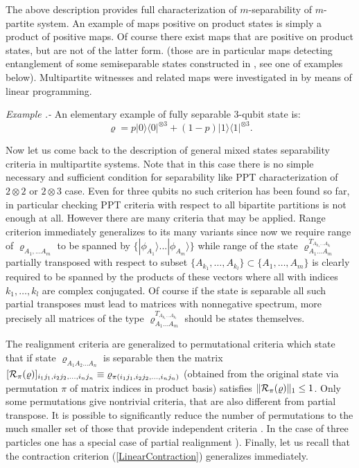 \documentclass[twocolumn,aps,rmp]{revtex4}
\begin{document}
The above description provides full characterization of
$m$-separability of $m$-partite system.  An example of maps positive
on product states is simply a product of positive maps. Of course
there exist maps that are positive on product states, but are not of
the latter form.  (those are in particular maps \cite{multisep}
detecting entanglement of some semiseparable states constructed in
\cite{BennettUPBI1999}, see one of examples below). Multipartite witnesses
and related maps were investigated in \cite{JafarizadehNH2006-wit}
by means of linear programming.

{\it Example .- } An elementary example of fully separable $3$-qubit
state is:
\begin{equation}
\varrho=p|0\rangle \langle 0|^{\otimes 3}+ (1-p)|1\rangle \langle
1|^{\otimes 3}.
\end{equation}

Now let us come back to the description of general mixed states
separability criteria in multipartite systems. Note that in this case
there is no simple necessary and sufficient condition for separability
like PPT characterization of $2 \otimes 2$ or $2 \otimes 3$ case. Even
for three qubits no such criterion has been found so far, in
particular checking PPT criteria with respect to all bipartite
partitions is not enough at all. However there are many criteria that
may be applied. Range criterion immediately generalizes to its many
variants since now we require range of $\varrho_{A_{1},...A_{m}}$ to
be spanned by $\{ |\phi_{A_1}\rangle...|\phi_{A_m}\rangle \}$ while
range of the state $\varrho_{A_{1}...A_{m}}^{T_{ A_{k_1}... A_{k_l}
  }}$ partially transposed with respect to subset $\{
A_{k_1},\ldots,A_{k_l} \} \subset \{ A_{1},\ldots,A_{m} \} $ is
clearly required to be spanned by the products of these vectors where
all with indices $k_1, \ldots, k_l$ are complex conjugated. Of course
if the state is separable all such partial transposes must lead to
matrices with nonnegative spectrum, more precisely all matrices of the
type $\varrho_{A_{1}...A_{m}}^{T_{ A_{k_1}... A_{k_l} }}$ should be
states themselves.

The realignment criteria are generalized to permutational criteria
\cite{HHH02-permut,ChenW2002-pla} which state that if state
$\varrho_{A_1A_2 ... A_n}$ is separable then the matrix $[{\cal
  R}_{\pi}(\varrho)]_{i_{1}j_{1},i_{2}j_{2},\ldots,i_{n}j_{n}}\equiv
{\varrho}_{\pi(i_{1}j_{1},i_{2}j_{2},\ldots,i_{n}j_{n})}$ (obtained
from the original state via permutation $\pi$ of matrix indices in
product basis) satisfies $\|{\cal R}_{\pi}(\varrho)\|_1\leq 1$.
Only some permutations give nontrivial criteria, that are also
different from partial transpose. It is possible to significantly
reduce the number of permutations to the much smaller set of those
that provide independent criteria \cite{HorodeckiWocjan}. In the case
of three particles one has a special case of partial realignment
\cite{HHH02-permut,ChenWu}).  Finally, let us recall that the
contraction criterion (\ref{LinearContraction}) generalizes
immediately.
\end{document}
